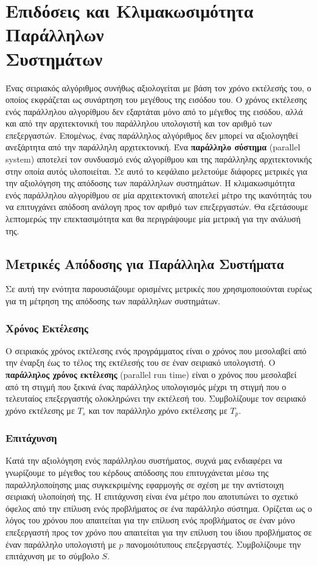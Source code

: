 \documentclass[12pt,a4paper]{article}
\begin{document}
\section[Επιδόσεις και Κλιμακωσιμότητα Παράλληλων Συστημάτων]
{Επιδόσεις και Κλιμακωσιμότητα Παράλληλων\\Συστημάτων}
Ένας σειριακός αλγόριθμος συνήθως αξιολογείται με βάση τον χρόνο εκτέλεσής 
του, ο οποίος εκφράζεται ως συνάρτηση του μεγέθους της εισόδου του. Ο 
χρόνος εκτέλεσης ενός παράλληλου αλγορίθμου δεν εξαρτάται μόνο από το 
μέγεθος της εισόδου, αλλά και από την αρχιτεκτονική του παράλληλου 
υπολογιστή και τον αριθμό των επεξεργαστών. Επομένως, ένας παράλληλος 
αλγόριθμος δεν μπορεί να αξιολογηθεί ανεξάρτητα από την παράλληλη 
αρχιτεκτονική. Ένα \textbf{παράλληλο σύστημα} 
(\foreignlanguage{english}{parallel system}) αποτελεί τον συνδυασμό ενός 
αλγορίθμου και της παράλληλης αρχιτεκτονικής στην οποία αυτός υλοποιείται.
Σε αυτό το κεφάλαιο μελετούμε διάφορες μετρικές για την αξιολόγηση της 
απόδοσης των παράλληλων συστημάτων.
Η κλιμακωσιμότητα ενός παράλληλου αλγορίθμου σε μία αρχιτεκτονική
αποτελεί μέτρο της ικανότητάς του να επιτυγχάνει απόδοση ανάλογη προς τον 
αριθμό των επεξεργαστών. Θα εξετάσουμε λεπτομερώς την επεκτασιμότητα
και θα περιγράψουμε μία μετρική για την ανάλυσή της.

\subsection{Μετρικές Απόδοσης για Παράλληλα Συστήματα}
Σε αυτή την ενότητα παρουσιάζουμε ορισμένες μετρικές που χρησιμοποιούνται 
ευρέως για τη μέτρηση της απόδοσης των παράλληλων συστημάτων.

\subsubsection{Χρόνος Εκτέλεσης}
Ο σειριακός χρόνος εκτέλεσης ενός προγράμματος είναι ο χρόνος που 
μεσολαβεί από την έναρξη έως το τέλος της εκτέλεσής του σε έναν σειριακό 
υπολογιστή. Ο \textbf{παράλληλος χρόνος εκτέλεσης}
(\foreignlanguage{english}{parallel run time}) είναι ο χρόνος που 
μεσολαβεί από τη στιγμή που ξεκινά ένας παράλληλος υπολογισμός μέχρι τη 
στιγμή που ο τελευταίος επεξεργαστής ολοκληρώνει την εκτέλεσή του.
Συμβολίζουμε τον σειριακό χρόνο εκτέλεσης με $T_s$ και τον παράλληλο 
χρόνο εκτέλεσης με $T_p$.

\subsubsection{Επιτάχυνση}
Κατά την αξιολόγηση ενός παράλληλου συστήματος, συχνά μας ενδιαφέρει να
γνωρίζουμε το μέγεθος του κέρδους απόδοσης που επιτυγχάνεται μέσω της
παραλληλοποίησης μιας συγκεκριμένης εφαρμογής σε σχέση με την αντίστοιχη
σειριακή υλοποίησή της. Η επιτάχυνση είναι ένα μέτρο που αποτυπώνει το
σχετικό όφελος από την επίλυση ενός προβλήματος σε ένα παράλληλο σύστημα.
Ορίζεται ως ο λόγος του χρόνου που απαιτείται για την επίλυση ενός
προβλήματος σε έναν μόνο επεξεργαστή προς τον χρόνο που απαιτείται για
την επίλυση του ίδιου προβλήματος σε έναν παράλληλο υπολογιστή με $p$
πανομοιότυπους επεξεργαστές. Συμβολίζουμε την επιτάχυνση με το σύμβολο $S$.
\end{document}
